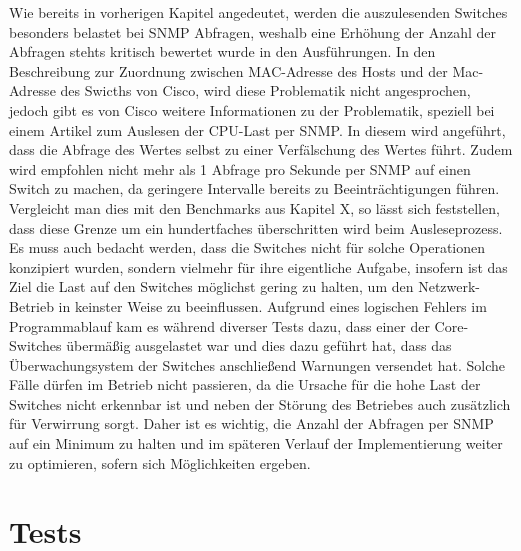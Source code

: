 Wie bereits in vorherigen Kapitel angedeutet, werden die auszulesenden Switches besonders belastet bei SNMP Abfragen, weshalb eine Erhöhung der Anzahl der Abfragen stehts kritisch bewertet wurde in den Ausführungen. In den Beschreibung zur Zuordnung zwischen MAC-Adresse des Hosts und der Mac-Adresse des Swicths von Cisco, wird diese Problematik nicht angesprochen, jedoch gibt es von Cisco weitere Informationen zu der Problematik, speziell bei einem Artikel zum Auslesen der CPU-Last per SNMP. In diesem wird angeführt, dass die Abfrage des Wertes selbst zu einer Verfälschung des Wertes führt. Zudem wird empfohlen nicht mehr als 1 Abfrage pro Sekunde per SNMP auf einen Switch zu machen, da geringere Intervalle bereits zu Beeinträchtigungen führen. Vergleicht man dies mit den Benchmarks aus Kapitel X, so lässt sich feststellen, dass diese Grenze um ein hundertfaches überschritten wird beim Ausleseprozess. Es muss auch bedacht werden, dass die Switches nicht für solche Operationen konzipiert wurden, sondern vielmehr für ihre eigentliche Aufgabe, insofern ist das Ziel die Last auf den Switches möglichst gering zu halten, um den Netzwerk-Betrieb in keinster Weise zu beeinflussen. Aufgrund eines logischen Fehlers im Programmablauf kam es während diverser Tests dazu, dass einer der Core-Switches übermäßig ausgelastet war und dies dazu geführt hat, dass das Überwachungsystem der Switches anschließend Warnungen versendet hat. Solche Fälle dürfen im Betrieb nicht passieren, da die Ursache für die hohe Last der Switches nicht erkennbar ist und neben der Störung des Betriebes auch zusätzlich für Verwirrung sorgt. Daher ist es wichtig, die Anzahl der Abfragen per SNMP auf ein Minimum zu halten und im späteren Verlauf der Implementierung weiter zu optimieren, sofern sich Möglichkeiten ergeben.

\section{Tests}
\label{sec:tests}

